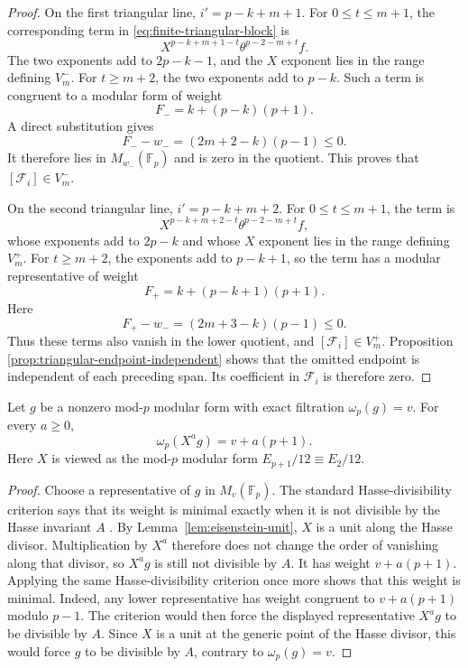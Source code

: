 \begin{proof}
On the first triangular line, $i'=p-k+m+1$.  For $0\leq t\leq m+1$,
the corresponding term in \eqref{eq:finite-triangular-block} is
\[
 X^{p-k+m+1-t}\theta^{p-2-m+t}f.
\]
The two exponents add to $2p-k-1$, and the $X$ exponent lies in the
range defining $V_m^-$.  For $t\geq m+2$, the two exponents add to
$p-k$.  Such a term is congruent to a modular form of weight
\[
 F_-=k+(p-k)(p+1).
\]
A direct substitution gives
\[
 F_--w_-=(2m+2-k)(p-1)\leq0.
\]
It therefore lies in $M_{w_-}(\mathbb F_p)$ and is zero in the quotient.
This proves that $[\mathcal F_i]\in V_m^-$.

On the second triangular line, $i'=p-k+m+2$.  For
$0\leq t\leq m+1$, the term is
\[
 X^{p-k+m+2-t}\theta^{p-2-m+t}f,
\]
whose exponents add to $2p-k$ and whose $X$ exponent lies in the range
defining $V_m^+$.  For $t\geq m+2$, the exponents add to $p-k+1$, so the
term has a modular representative of weight
\[
 F_+=k+(p-k+1)(p+1).
\]
Here
\[
 F_+-w_-=(2m+3-k)(p-1)\leq0.
\]
Thus these terms also vanish in the lower quotient, and
$[\mathcal F_i]\in V_m^+$.  Proposition
\ref{prop:triangular-endpoint-independent} shows that the omitted endpoint
is independent of each preceding span.  Its coefficient in
$\mathcal F_i$ is therefore zero.
\end{proof}

\begin{lemma}
\label{lem:x-exact-filtration}
Let $g$ be a nonzero mod-$p$ modular form with exact filtration
$\omega_p(g)=v$.  For every $a\geq0$,
\[
 \omega_p(X^ag)=v+a(p+1).
\]
Here $X$ is viewed as the mod-$p$ modular form
$E_{p+1}/12\equiv E_2/12$.
\end{lemma}

\begin{proof}
Choose a representative of $g$ in $M_v(\mathbb F_p)$.  The standard
Hasse-divisibility criterion says that its weight is minimal exactly when
it is not divisible by the Hasse invariant $A$
\cite{SwDyer1973,Katz1973}.  By Lemma~\ref{lem:eisenstein-unit}, $X$ is a
unit along the Hasse divisor.  Multiplication by $X^a$ therefore does not
change the order of vanishing along that divisor, so $X^ag$ is still not
divisible by $A$.  It has weight $v+a(p+1)$.  Applying the same
Hasse-divisibility criterion once more shows that this weight is minimal.
Indeed, any lower representative has weight congruent to
$v+a(p+1)$ modulo $p-1$.  The criterion would then force the displayed
representative $X^ag$ to be divisible by $A$.  Since $X$ is a unit at the
generic point of the Hasse divisor, this would force $g$ to be divisible by
$A$, contrary to $\omega_p(g)=v$.
\end{proof}

